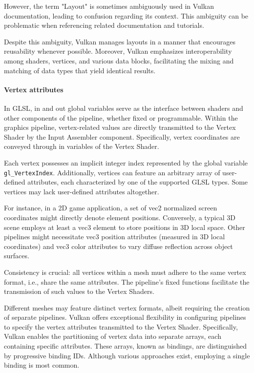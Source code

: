 However, the term "Layout" is sometimes ambiguously used in Vulkan documentation, leading to confusion regarding its context. 
This ambiguity can be problematic when referencing related documentation and tutorials.

Despite this ambiguity, Vulkan manages layouts in a manner that encourages reusability whenever possible. 
Moreover, Vulkan emphasizes interoperability among shaders, vertices, and various data blocks, facilitating the mixing and matching of data types that yield identical results.




\paragraph*{Vertex attributes}
In GLSL, in and out global variables serve as the interface between shaders and other components of the pipeline, whether fixed or programmable.
Within the graphics pipeline, vertex-related values are directly transmitted to the Vertex Shader by the Input Assembler component. 
Specifically, vertex coordinates are conveyed through in variables of the Vertex Shader.

Each vertex possesses an implicit integer index represented by the global variable \texttt{gl\_VertexIndex}. 
Additionally, vertices can feature an arbitrary array of user-defined attributes, each characterized by one of the supported GLSL types. 
Some vertices may lack user-defined attributes altogether.

For instance, in a 2D game application, a set of vec2 normalized screen coordinates might directly denote element positions. 
Conversely, a typical 3D scene employs at least a vec3 element to store positions in 3D local space. 
Other pipelines might necessitate vec3 position attributes (measured in 3D local coordinates) and vec3 color attributes to vary diffuse reflection across object surfaces.

Consistency is crucial: all vertices within a mesh must adhere to the same vertex format, i.e., share the same attributes. 
The pipeline's fixed functions facilitate the transmission of such values to the Vertex Shaders.

Different meshes may feature distinct vertex formats, albeit requiring the creation of separate pipelines. 
Vulkan offers exceptional flexibility in configuring pipelines to specify the vertex attributes transmitted to the Vertex Shader.
Specifically, Vulkan enables the partitioning of vertex data into separate arrays, each containing specific attributes. 
These arrays, known as bindings, are distinguished by progressive binding IDs. 
Although various approaches exist, employing a single binding is most common.

